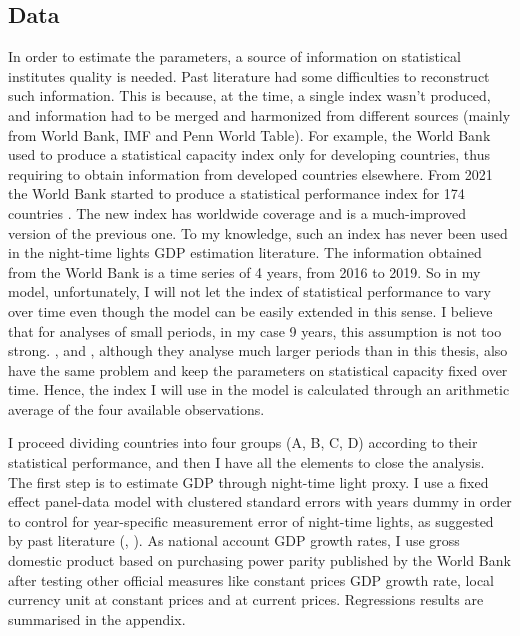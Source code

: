  \subsection{Data}
 In order to estimate the parameters, a source of information on statistical institutes quality is needed. Past literature had some difficulties to reconstruct such information. This is because, at the time, a single index wasn't produced, and information had to be merged and harmonized from different sources (mainly from World Bank, IMF and Penn World Table). For example, the World Bank used to produce a statistical capacity index only for developing countries, thus requiring to obtain information from developed countries elsewhere. From 2021 the World Bank started to produce a statistical performance index for 174 countries \citep{dang2021measuring}.
 The new index has worldwide coverage and is a much-improved version of the previous one. To my knowledge, such an index has never been used in the night-time lights GDP estimation literature.
 The information obtained from the World Bank is a time series of 4 years, from 2016 to 2019. So in my model, unfortunately, I will not let the index of statistical performance to vary over time even though the model can be easily extended in this sense.
I believe that for analyses of small periods, in my case 9 years, this assumption is not too strong. \citet{henderson2012measuring}, and \citet{chen2011using}, although they analyse much larger periods than in this thesis, also have the same problem and keep the parameters on statistical capacity fixed over time. 
Hence, the index I will use in the model is calculated through an arithmetic average of the four available observations.
 
 I proceed dividing countries into four groups (A, B, C, D) according to their statistical performance, and then I have all the elements to close the analysis. 
 The first step is to estimate GDP through night-time light proxy. I use a fixed effect panel-data model with clustered standard errors with years dummy in order to control for year-specific measurement error of night-time lights, as suggested by past literature (\citet{henderson2012measuring}, \citet{beyer2022measuring}). 
 As national account GDP growth rates, I use gross domestic product based on purchasing power parity published by the World Bank after testing other official measures like constant prices GDP growth rate, local currency unit at constant prices and at current prices.
 Regressions results are summarised in the appendix.
 
